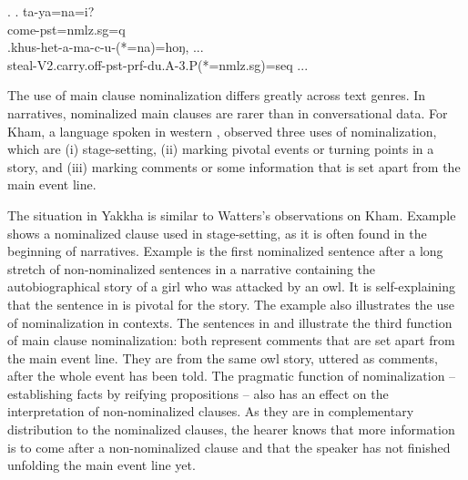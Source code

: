 \ex. \ag. ta-ya=na=i?\\
		come{\sc [3sg]-pst=nmlz.sg=q}	\\
 	\bg.khus-het-a-ma-c-u-(*=na)=hoŋ, ...\\
	steal-{\sc V2.carry.off-pst-prf-du.A-3.P(*=nmlz.sg)=seq} ...\\
	 


The use of main clause nominalization differs greatly across text genres. In narratives, nominalized main clauses are rarer than in conversational data. For Kham, a  language spoken in western , \citet{Watters2002A-grammar} observed three uses of nominalization, which are (i) stage-setting, (ii) marking pivotal events or turning points in a story, and (iii) marking comments or some information that is set apart from the main event line. 

\largerpage
The situation in Yakkha is  similar to Watters's observations on Kham. Example \Next[a] shows a nominalized clause used in stage-setting, as it is often found in the beginning of narratives. Example  \Next[b] is the first nominalized sentence after a long stretch of non-nom\-i\-nal\-ized sentences in a narrative containing the autobiographical story of a girl who was attacked by an owl. It is self-explaining that the sentence in \Next[b] is pivotal for the story. The example also illustrates the use of nominalization in  contexts. The sentences in \Next[c] and \Next[d] illustrate the third function of main clause nominalization: both represent comments that are set apart from the main event line. They are from the same owl story, uttered as comments, after the whole event has been told. The  pragmatic function of nominalization –  establishing facts by reifying propositions – also has an effect on the interpretation of non-nominalized clauses.  As they are in complementary distribution to the nominalized clauses, the hearer knows that more information is to come after a non-nominalized clause and that the speaker has not finished unfolding the main event line yet.




